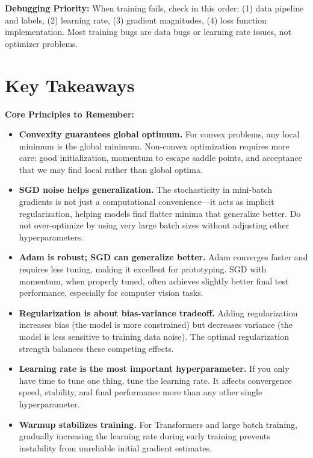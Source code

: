 \documentclass[../../editions/book2-optimization/main.tex]{subfiles}
\begin{document}
\begin{important}
\textbf{Debugging Priority:} When training fails, check in this order: (1) data pipeline and labels, (2) learning rate, (3) gradient magnitudes, (4) loss function implementation. Most training bugs are data bugs or learning rate issues, not optimizer problems.
\end{important}

\section*{Key Takeaways}

\begin{keyconcept}
\textbf{Core Principles to Remember:}
\begin{itemize}
    \item \textbf{Convexity guarantees global optimum.} For convex problems, any local minimum is the global minimum. Non-convex optimization requires more care: good initialization, momentum to escape saddle points, and acceptance that we may find local rather than global optima.

    \item \textbf{SGD noise helps generalization.} The stochasticity in mini-batch gradients is not just a computational convenience---it acts as implicit regularization, helping models find flatter minima that generalize better. Do not over-optimize by using very large batch sizes without adjusting other hyperparameters.

    \item \textbf{Adam is robust; SGD can generalize better.} Adam converges faster and requires less tuning, making it excellent for prototyping. SGD with momentum, when properly tuned, often achieves slightly better final test performance, especially for computer vision tasks.

    \item \textbf{Regularization is about bias-variance tradeoff.} Adding regularization increases bias (the model is more constrained) but decreases variance (the model is less sensitive to training data noise). The optimal regularization strength balances these competing effects.

    \item \textbf{Learning rate is the most important hyperparameter.} If you only have time to tune one thing, tune the learning rate. It affects convergence speed, stability, and final performance more than any other single hyperparameter.

    \item \textbf{Warmup stabilizes training.} For Transformers and large batch training, gradually increasing the learning rate during early training prevents instability from unreliable initial gradient estimates.
\end{itemize}
\end{keyconcept}
\end{document}
